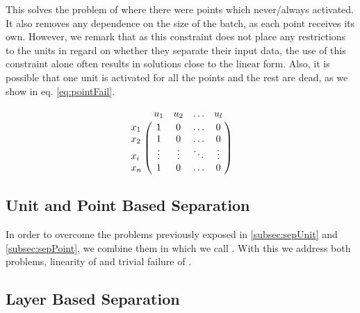 This solves the problem of \SepUnit where there were points which never/always activated. It also removes any dependence on the size of the batch, as each point receives its own. However, we remark that as this constraint does not place any restrictions to the units in regard on whether they separate their input data, the use of this constraint alone often results in solutions close to the linear form. Also, it is possible that one unit is activated for all the points and the rest are dead, as we show in eq. \ref{eq:pointFail}.

\begin{equation}\label{eq:pointFail}
    \bordermatrix{ &u_1& u_2&\ldots &u_l\cr
                x_1& 1 &  0  & \ldots & 0\cr
                x_2& 1  &  0 & \ldots & 0\cr
                x_i& \vdots & \vdots & \ddots & \vdots\cr
                x_n& 1  &   0       &\ldots & 0} \\[15pt]
\end{equation}

\subsection{Unit and Point Based Separation \SepUnitPoint}\label{subsec:sepUnitPoint}

In order to overcome the problems previously exposed in \ref{subsec:sepUnit} and \ref{subsec:sepPoint}, we combine them in which we call \SepUnitPoint. With this we address both problems, linearity of \SepPoint and trivial failure of \SepUnit.

\subsection{Layer Based Separation \SepLayer}\label{subsec:sepLayer}

